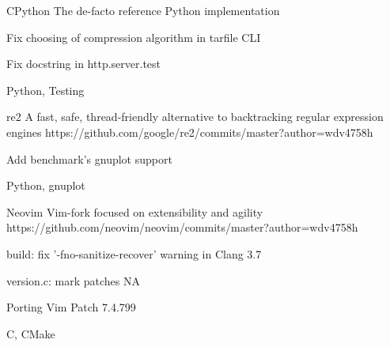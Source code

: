 \begin{cvopensources}
  \cvopensource
    {CPython}
    {The de-facto reference Python implementation}
    {}
    {
      \begin{cvitems}
        \item {Fix choosing of compression algorithm in tarfile CLI}
        \item {Fix docstring in http.server.test}
      \end{cvitems}
    }
    {Python, Testing}

  \cvopensource
    {re2}
    {A fast, safe, thread-friendly alternative to backtracking regular expression engines}
    {https://github.com/google/re2/commits/master?author=wdv4758h}
    {
      \begin{cvitems}
        \item {Add benchmark's gnuplot support}
      \end{cvitems}
    }
    {Python, gnuplot}

  \cvopensource
    {Neovim}
    {Vim-fork focused on extensibility and agility}
    {https://github.com/neovim/neovim/commits/master?author=wdv4758h}
    {
      \begin{cvitems}
        \item {build: fix '-fno-sanitize-recover' warning in Clang 3.7 }
        \item {version.c: mark patches NA}
        \item {Porting Vim Patch 7.4.799}
      \end{cvitems}
    }
    {C, CMake}

\end{cvopensources}
